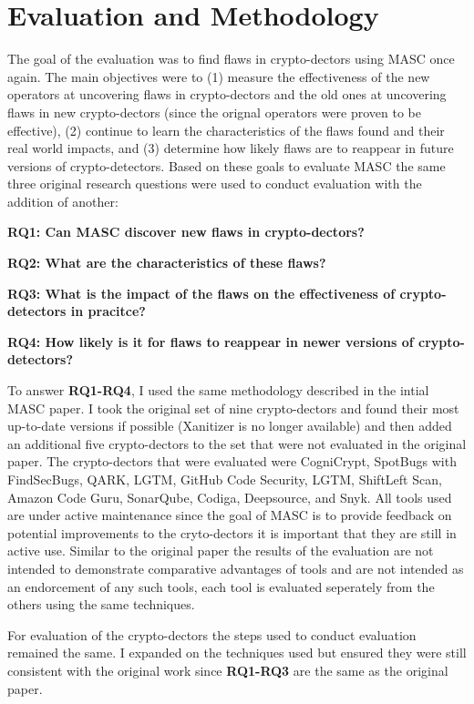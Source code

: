 \chapter{Evaluation and Methodology}
\label{chap_evaluation}

The goal of the evaluation was to find flaws in crypto-dectors using MASC once again. The main objectives were to (1) measure the effectiveness of the new operators at uncovering flaws in crypto-dectors and the old ones at uncovering flaws in new crypto-dectors (since the orignal operators were proven to be effective), (2) continue to learn the characteristics of the flaws found and their real world impacts, and (3) determine how likely flaws are to reappear in future versions of crypto-detectors. Based on these goals to evaluate MASC the same three original research questions were used to conduct evaluation with the addition of another:

\textbf{RQ1: Can MASC discover new flaws in crypto-dectors?}

\textbf{RQ2: What are the characteristics of these flaws?}

\textbf{RQ3: What is the impact of the flaws on the effectiveness of crypto-detectors in pracitce?}

\textbf{RQ4: How likely is it for flaws to reappear in newer versions of crypto-detectors?}

To answer \textbf{RQ1-RQ4}, I used the same methodology described in the intial MASC paper. I took the original set of nine crypto-dectors and found their most up-to-date versions if possible (Xanitizer is no longer available) and then added an additional five crypto-dectors to the set that were not evaluated in the original paper. The crypto-dectors that were evaluated were CogniCrypt, SpotBugs with FindSecBugs, QARK, LGTM, GitHub Code Security, LGTM, ShiftLeft Scan, Amazon Code Guru, SonarQube, Codiga, Deepsource, and Snyk. All tools used are under active maintenance since the goal of MASC is to provide feedback on potential improvements to the cryto-dectors it is important that they are still in active use. Similar to the original paper the results of the evaluation are not intended to demonstrate comparative advantages of tools and are not intended as an endorcement of any such tools, each tool is evaluated seperately from the others using the same techniques.

For evaluation of the crypto-dectors the steps used to conduct evaluation remained the same. I expanded on the techniques used but ensured they were still consistent with the original work since \textbf{RQ1-RQ3} are the same as the original paper.

